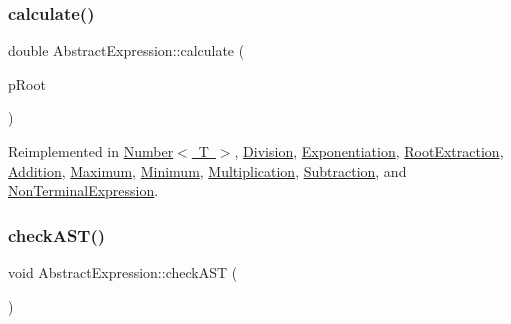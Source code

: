\subsubsection{\texorpdfstring{calculate()}{calculate()}}
{\footnotesize\ttfamily double Abstract\+Expression\+::calculate (\begin{DoxyParamCaption}\item[{std\+::unique\+\_\+ptr$<$ \mbox{\hyperlink{class_abstract_expression}{Abstract\+Expression}} $>$ \&}]{p\+Root }\end{DoxyParamCaption})\hspace{0.3cm}{\ttfamily [virtual]}}



Reimplemented in \mbox{\hyperlink{class_number_a870d87540c5e4fc92b061eb11ba1853f}{Number$<$ T $>$}}, \mbox{\hyperlink{class_division_a3b5308f2382926667d23c9fa8267480e}{Division}}, \mbox{\hyperlink{class_exponentiation_ab04f25d16cb5a51d71acdb9ac600c745}{Exponentiation}}, \mbox{\hyperlink{class_root_extraction_ac1c92d2ec68a385f64c828a1a2ff94fa}{Root\+Extraction}}, \mbox{\hyperlink{class_addition_a162afcbf8cc7ecc74af2ad2291d0abbe}{Addition}}, \mbox{\hyperlink{class_maximum_ab10a5344f64954905d17d72f4573f805}{Maximum}}, \mbox{\hyperlink{class_minimum_a181a156021f98d15bd1aa6484ff587cc}{Minimum}}, \mbox{\hyperlink{class_multiplication_a2d82ad71d5bb01c3fc3bab1240db9031}{Multiplication}}, \mbox{\hyperlink{class_subtraction_a45931b8ab5514a4517ac2533f50d5235}{Subtraction}}, and \mbox{\hyperlink{class_non_terminal_expression_a41f5031f53384915aef5c19a88671afe}{Non\+Terminal\+Expression}}.

\mbox{\label{class_abstract_expression_a703563fdf65d18ce4b7f2817e2ff4581}} 
\subsubsection{\texorpdfstring{checkAST()}{checkAST()}}
{\footnotesize\ttfamily void Abstract\+Expression\+::check\+A\+ST (\begin{DoxyParamCaption}{ }\end{DoxyParamCaption})\hspace{0.3cm}{\ttfamily [virtual]}}



